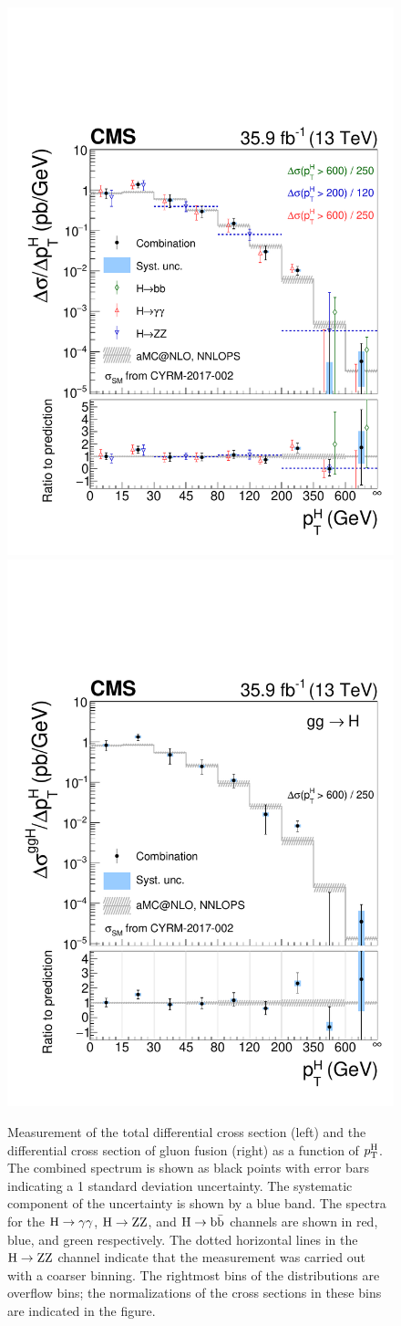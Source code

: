 \begin{figure}[hbtp]
  \begin{center}
    \includegraphics[width=0.49\linewidth]{img/differentials/spectra_pth_smH.pdf}
    \includegraphics[width=0.49\linewidth]{img/differentials/spectra_pth_ggH.pdf}
    \caption{
        Measurement of the total differential cross section (left) and the differential cross section of gluon fusion (right) as a function of $p_\mathrm{T}^\mathrm{H}$. The combined spectrum is shown as black points with error bars indicating a 1 standard deviation uncertainty. The systematic component of the uncertainty is shown by a blue band. The spectra for the $\mathrm{H}\to\mathrm{\gamma}\mathrm{\gamma}$, $\mathrm{H}\to\mathrm{Z}\mathrm{Z}$, and $\mathrm{H}\to\mathrm{b}\bar{\mathrm{b}}$ channels are shown in red, blue, and green respectively.
        The dotted horizontal lines in the $\mathrm{H}\to\mathrm{Z}\mathrm{Z}$ channel indicate that the measurement was carried out with a coarser binning.
        The rightmost bins of the distributions are overflow bins; the normalizations of the cross sections in these bins are indicated in the figure.
        }
    \label{fig:CombinedSpectra_pth}
  \end{center}
\end{figure}

